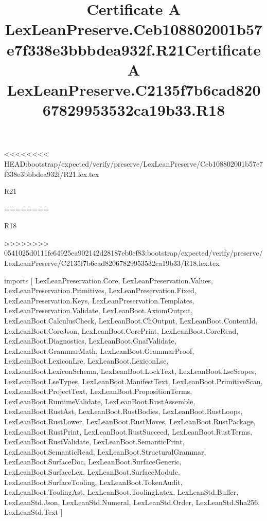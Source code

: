 <<<<<<<< HEAD:bootstrap/expected/verify/preserve/LexLeanPreserve/Ceb108802001b57e7f338e3bbbdea932f/R21.lex.tex
\begin{lexlean}{R21}
\title{Certificate A LexLeanPreserve.Ceb108802001b57e7f338e3bbbdea932f.R21}
========
\begin{lexlean}{R18}
\title{Certificate A LexLeanPreserve.C2135f7b6cad82067829953532ca19b33.R18}
>>>>>>>> 0541025d0111fe64925ea902142d28187eb0ef83:bootstrap/expected/verify/preserve/LexLeanPreserve/C2135f7b6cad82067829953532ca19b33/R18.lex.tex
\begin{coremodule}
imports [
  LexLeanPreservation.Core,
  LexLeanPreservation.Values,
  LexLeanPreservation.Primitives,
  LexLeanPreservation.Fixed,
  LexLeanPreservation.Keys,
  LexLeanPreservation.Templates,
  LexLeanPreservation.Validate,
  LexLeanBoot.AxiomOutput,
  LexLeanBoot.CalculusCheck,
  LexLeanBoot.CliOutput,
  LexLeanBoot.ContentId,
  LexLeanBoot.CoreJson,
  LexLeanBoot.CorePrint,
  LexLeanBoot.CoreRead,
  LexLeanBoot.Diagnostics,
  LexLeanBoot.GnafValidate,
  LexLeanBoot.GrammarMath,
  LexLeanBoot.GrammarProof,
  LexLeanBoot.LexiconLre,
  LexLeanBoot.LexiconLse,
  LexLeanBoot.LexiconSchema,
  LexLeanBoot.LockText,
  LexLeanBoot.LseScopes,
  LexLeanBoot.LseTypes,
  LexLeanBoot.ManifestText,
  LexLeanBoot.PrimitiveScan,
  LexLeanBoot.ProjectText,
  LexLeanBoot.PropositionTerms,
  LexLeanBoot.RuntimeValidate,
  LexLeanBoot.RustAssemble,
  LexLeanBoot.RustAst,
  LexLeanBoot.RustBodies,
  LexLeanBoot.RustLoops,
  LexLeanBoot.RustLower,
  LexLeanBoot.RustMoves,
  LexLeanBoot.RustPackage,
  LexLeanBoot.RustPrint,
  LexLeanBoot.RustSucceed,
  LexLeanBoot.RustTerms,
  LexLeanBoot.RustValidate,
  LexLeanBoot.SemanticPrint,
  LexLeanBoot.SemanticRead,
  LexLeanBoot.StructuralGrammar,
  LexLeanBoot.SurfaceDoc,
  LexLeanBoot.SurfaceGeneric,
  LexLeanBoot.SurfaceLex,
  LexLeanBoot.SurfaceModule,
  LexLeanBoot.SurfaceTooling,
  LexLeanBoot.TokenAudit,
  LexLeanBoot.ToolingAst,
  LexLeanBoot.ToolingLatex,
  LexLeanStd.Buffer,
  LexLeanStd.Json,
  LexLeanStd.Numeral,
  LexLeanStd.Order,
  LexLeanStd.Sha256,
  LexLeanStd.Text
]


\end{coremodule}
\end{lexlean}
\end{lexlean}
